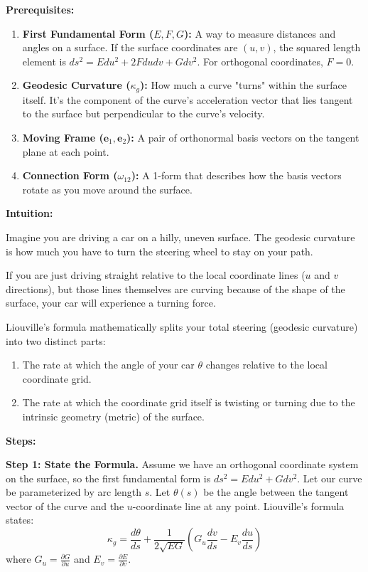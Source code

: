 \begin{solution}
\textbf{Prerequisites:}
\begin{enumerate}
    \item \textbf{First Fundamental Form ($E, F, G$):} A way to measure distances and angles on a surface. If the surface coordinates are $(u,v)$, the squared length element is $ds^2 = E du^2 + 2F du dv + G dv^2$. For orthogonal coordinates, $F=0$.
    \item \textbf{Geodesic Curvature ($\kappa_g$):} How much a curve "turns" within the surface itself. It's the component of the curve's acceleration vector that lies tangent to the surface but perpendicular to the curve's velocity.
    \item \textbf{Moving Frame ($\mathbf{e}_1, \mathbf{e}_2$):} A pair of orthonormal basis vectors on the tangent plane at each point.
    \item \textbf{Connection Form ($\omega_{12}$):} A 1-form that describes how the basis vectors rotate as you move around the surface.
\end{enumerate}

\textbf{Intuition:}

Imagine you are driving a car on a hilly, uneven surface. The geodesic curvature is how much you have to turn the steering wheel to stay on your path.

If you are just driving straight relative to the local coordinate lines ($u$ and $v$ directions), but those lines themselves are curving because of the shape of the surface, your car will experience a turning force.

Liouville's formula mathematically splits your total steering (geodesic curvature) into two distinct parts:
\begin{enumerate}
    \item The rate at which the angle of your car $\theta$ changes relative to the local coordinate grid.
    \item The rate at which the coordinate grid itself is twisting or turning due to the intrinsic geometry (metric) of the surface.
\end{enumerate}
\textbf{Steps:}

\textbf{Step 1: State the Formula.}
Assume we have an orthogonal coordinate system on the surface, so the first fundamental form is $ds^2 = E du^2 + G dv^2$.
Let our curve be parameterized by arc length $s$. Let $\theta(s)$ be the angle between the tangent vector of the curve and the $u$-coordinate line at any point.
Liouville's formula states:
\[ \kappa_g = \frac{d\theta}{ds} + \frac{1}{2\sqrt{EG}} \left( G_u \frac{dv}{ds} - E_v \frac{du}{ds} \right) \]
where $G_u = \frac{\partial G}{\partial u}$ and $E_v = \frac{\partial E}{\partial v}$.


\end{solution}
